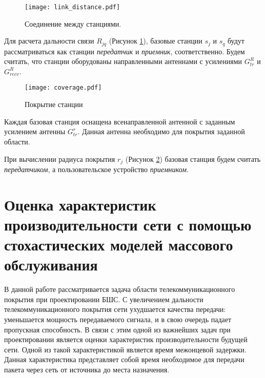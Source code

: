 \begin{figure}[h!]
  \centering
   \texttt{[image: link\_distance.pdf]}
\caption{Соединение между станциями.}
\label{fig:part3_link_distance}
\end{figure}

Для расчета дальности связи $R_{jq}$ (Рисунок \cref{fig:part3_link_distance}), базовые станции $s_j$ и $s_q$ будут рассматриваться как станции \textit{передатчик} и \textit{приемник}, соответственно. Будем считать, что станции оборудованы направленными антеннами с усилениями $G_{tr}^{R}$ и $G_{recv}^{R}$.

\begin{figure}[h!]
  \centering
   \texttt{[image: coverage.pdf]}
\caption{Покрытие станции}
\label{fig:part3_coverage}
\end{figure}

Каждая базовая станция оснащена всенаправленной антенной с заданным усилением антенны $G_ {tr}^{r}$. Данная антенна необходимо для покрытия заданной области.


При вычислении радиуса покрытия $r_j$ (Рисунок  \cref{fig:part3_coverage}) базовая станция будем считать \textit{передатчиком}, а пользовательское устройство \textit{приемником}.


\section{Оценка характеристик производительности сети с помощью стохастических моделей массового обслуживания}

В данной работе рассматривается задача области телекоммуникационного покрытия при проектировании БШС.  С увеличением дальности телекоммуникационного покрытия сети ухудшается качества передачи: уменьшается мощность передаваемого сигнала, и в свою очередь падает пропускная способность. В связи с этим одной из важнейших задач при проектировании является оценки характеристик производительности будущей сети. Одной из такой характеристикой является время межонцевой задержки. Данная характеристика представляет собой время необходимое для передачи пакета через сеть от источника до места назначения.
 

